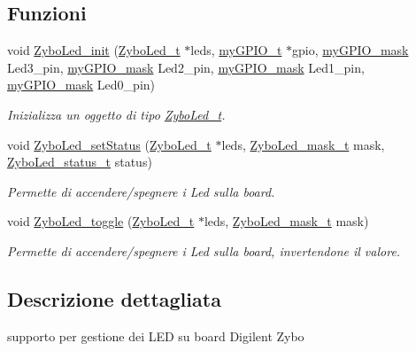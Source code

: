 \subsection*{Funzioni}
\begin{DoxyCompactItemize}
\item 
void \hyperlink{group___led_ga51bccd37e6ae8cd32e2c50c60a5e83cc}{Zybo\+Led\+\_\+init} (\hyperlink{struct_zybo_led__t}{Zybo\+Led\+\_\+t} $\ast$leds, \hyperlink{structmy_g_p_i_o__t}{my\+G\+P\+I\+O\+\_\+t} $\ast$gpio, \hyperlink{group__bare-metal_ga402a0d20afc0cb7c25554b8b023f4253}{my\+G\+P\+I\+O\+\_\+mask} Led3\+\_\+pin, \hyperlink{group__bare-metal_ga402a0d20afc0cb7c25554b8b023f4253}{my\+G\+P\+I\+O\+\_\+mask} Led2\+\_\+pin, \hyperlink{group__bare-metal_ga402a0d20afc0cb7c25554b8b023f4253}{my\+G\+P\+I\+O\+\_\+mask} Led1\+\_\+pin, \hyperlink{group__bare-metal_ga402a0d20afc0cb7c25554b8b023f4253}{my\+G\+P\+I\+O\+\_\+mask} Led0\+\_\+pin)
\begin{DoxyCompactList}\small\item\em Inizializza un oggetto di tipo \hyperlink{struct_zybo_led__t}{Zybo\+Led\+\_\+t}. \end{DoxyCompactList}\item 
void \hyperlink{group___led_gacf5c2b0328c4bdf2d796397fc4510c69}{Zybo\+Led\+\_\+set\+Status} (\hyperlink{struct_zybo_led__t}{Zybo\+Led\+\_\+t} $\ast$leds, \hyperlink{group___led_gad11701cccac394f7e1f90de8f85695f3}{Zybo\+Led\+\_\+mask\+\_\+t} mask, \hyperlink{group___led_ga3dcb274f22e577705c49944b8d1f4b12}{Zybo\+Led\+\_\+status\+\_\+t} status)
\begin{DoxyCompactList}\small\item\em Permette di accendere/spegnere i Led sulla board. \end{DoxyCompactList}\item 
void \hyperlink{group___led_ga20ddd78a98b4c0123c5b964aa0a59046}{Zybo\+Led\+\_\+toggle} (\hyperlink{struct_zybo_led__t}{Zybo\+Led\+\_\+t} $\ast$leds, \hyperlink{group___led_gad11701cccac394f7e1f90de8f85695f3}{Zybo\+Led\+\_\+mask\+\_\+t} mask)
\begin{DoxyCompactList}\small\item\em Permette di accendere/spegnere i Led sulla board, invertendone il valore. \end{DoxyCompactList}\end{DoxyCompactItemize}


\subsection{Descrizione dettagliata}
supporto per gestione dei L\+ED su board Digilent Zybo 




